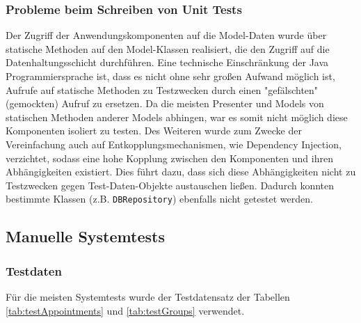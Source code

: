 \subsubsection{Probleme beim Schreiben von Unit Tests}
Der Zugriff der Anwendungskomponenten auf die Model-Daten wurde über statische Methoden auf den Model-Klassen realisiert, die den Zugriff auf die Datenhaltungsschicht durchführen. Eine technische Einschränkung der Java Programmiersprache ist, dass es nicht ohne sehr großen Aufwand möglich ist, Aufrufe auf statische Methoden zu Testzwecken durch einen "gefälschten" (gemockten) Aufruf zu ersetzen. Da die meisten Presenter und Models von statischen Methoden anderer Models abhingen, war es somit nicht möglich diese Komponenten isoliert zu testen. Des Weiteren wurde zum Zwecke der Vereinfachung auch auf Entkopplungsmechanismen, wie Dependency Injection, verzichtet, sodass eine hohe Kopplung zwischen den Komponenten und ihren Abhängigkeiten existiert. Dies führt dazu, dass sich diese Abhängigkeiten nicht zu Testzwecken gegen Test-Daten-Objekte austauschen ließen. Dadurch konnten bestimmte Klassen (z.B. \texttt{DBRepository}) ebenfalls nicht getestet werden.

\subsection{Manuelle Systemtests}
\subsubsection{Testdaten}
Für die meisten Systemtests wurde der Testdatensatz der Tabellen \ref{tab:testAppointments} und \ref{tab:testGroups} verwendet.

